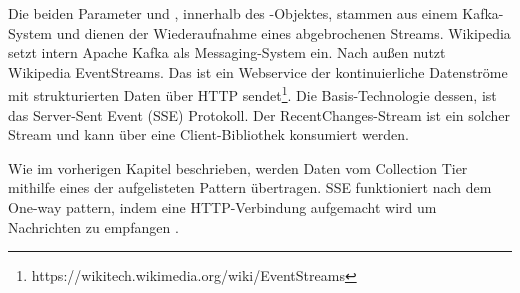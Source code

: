 Die beiden Parameter  und , innerhalb des -Objektes, stammen aus einem Kafka-System
und dienen der Wiederaufnahme eines abgebrochenen Streams. Wikipedia setzt intern Apache Kafka als Messaging-System ein.
Nach außen nutzt Wikipedia EventStreams. Das ist ein Webservice der kontinuierliche Datenströme mit strukturierten Daten
über HTTP sendet\footnote{https://wikitech.wikimedia.org/wiki/EventStreams}. Die Basis-Technologie dessen, ist
das Server-Sent Event (SSE) Protokoll. Der RecentChanges-Stream ist ein solcher Stream und kann über eine Client-Bibliothek
konsumiert werden.

Wie im vorherigen Kapitel beschrieben, werden Daten vom Collection Tier mithilfe eines der aufgelisteten Pattern übertragen.
SSE funktioniert nach dem One-way pattern, indem eine HTTP-Verbindung aufgemacht wird um Nachrichten zu empfangen \cite{EventSource_SSE}.

